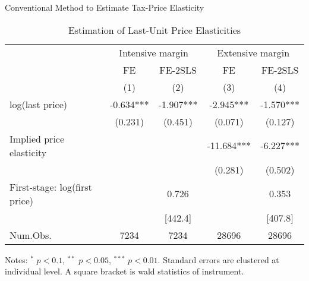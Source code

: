 \documentclass[
  ignorenonframetext,
  aspectratio=169,
]{beamer}
\begin{document}
\begin{frame}{Conventional Method to Estimate Tax-Price Elasticity}
\protect\hypertarget{conventional-method-to-estimate-tax-price-elasticity}{}
\begin{table}

\caption{\label{tab:MainElasticity}Estimation of Last-Unit Price Elasticities}
\centering
\fontsize{7}{9}\selectfont
\begin{threeparttable}
\begin{tabular}[t]{lcccc}
\toprule
\multicolumn{1}{c}{ } & \multicolumn{2}{c}{Intensive margin} & \multicolumn{2}{c}{Extensive margin} \\
\cmidrule(l{3pt}r{3pt}){2-3} \cmidrule(l{3pt}r{3pt}){4-5}
\multicolumn{1}{c}{ } & \multicolumn{1}{c}{FE} & \multicolumn{1}{c}{FE-2SLS} & \multicolumn{1}{c}{FE} & \multicolumn{1}{c}{FE-2SLS} \\
\cmidrule(l{3pt}r{3pt}){2-2} \cmidrule(l{3pt}r{3pt}){3-3} \cmidrule(l{3pt}r{3pt}){4-4} \cmidrule(l{3pt}r{3pt}){5-5}
  & (1) & (2) & (3) & (4)\\
\midrule
log(last price) & -0.634*** & -1.907*** & -2.945*** & -1.570***\\
 & (0.231) & (0.451) & (0.071) & (0.127)\\
\midrule
Implied price elasticity &  &  & -11.684*** & -6.227***\\
 &  &  & (0.281) & (0.502)\\
First-stage: log(first price) &  & 0.726 &  & 0.353\\
 &  & [442.4] &  & [407.8]\\
Num.Obs. & 7234 & 7234 & 28696 & 28696\\
\bottomrule
\end{tabular}
\begin{tablenotes}
\item Notes: $^{*}$ $p < 0.1$, $^{**}$ $p < 0.05$, $^{***}$ $p < 0.01$. Standard errors are clustered at individual level. A square bracket is wald statistics of instrument.
\end{tablenotes}
\end{threeparttable}
\end{table}
\end{frame}
\end{document}
